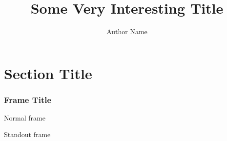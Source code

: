 \documentclass[aspectratio=169]{beamer}
\title{Some Very Interesting Title}
\author{Author Name}
\institute{Cool Conference}
\begin{document}
\maketitle

\section{Section Title}

\begin{frame}
  \frametitle{Frame Title}
  Normal frame
\end{frame}

\begin{frame}[standout]
  Standout frame
\end{frame}
\end{document}
